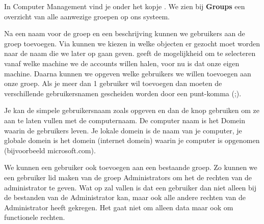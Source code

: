 In Computer Management vind je onder  het kopje . We zien bij \textbf{Groups} een overzicht van alle aanwezige groepen op ons systeem.

\begin{minipage}[t]{\linewidth}
\raggedright
{}
\end{minipage}

Na een naam voor de groep en een beschrijving kunnen we gebruikers aan de groep toevoegen. Via  kunnen we kiezen in welke objecten er gezocht moet worden naar de naam die we later op gaan geven.  geeft de mogelijkheid om te selecteren vanaf welke machine we de accounts willen halen, voor nu is dat onze eigen machine. Daarna kunnen we opgeven welke gebruikers we willen toevoegen aan onze groep. Als je meer dan 1 gebruiker wil toevoegen dan moeten de verschillende gebruikersnamen gescheiden worden door een punt-komma (;).

Je kan de simpele gebruikersnaam zoals  opgeven en dan de  knop gebruiken om ze aan te laten vullen met de computernaam. De computer naam is het Domein waarin de gebruikers leven. Je lokale domein is de naam van je computer, je globale domein is het domein (internet domein) waarin je computer is opgenomen (bijvoorbeeld microsoft.com).

We kunnen een gebruiker ook toevoegen aan een bestaande groep. Zo kunnen we een gebruiker lid maken van de groep Administrators om het de rechten van de administrator te geven. Wat op zal vallen is dat een gebruiker dan niet alleen bij de bestanden van de Administrator kan, maar ook alle andere rechten van de Administrator heeft gekregen. Het gaat niet om alleen data maar ook om functionele rechten.

